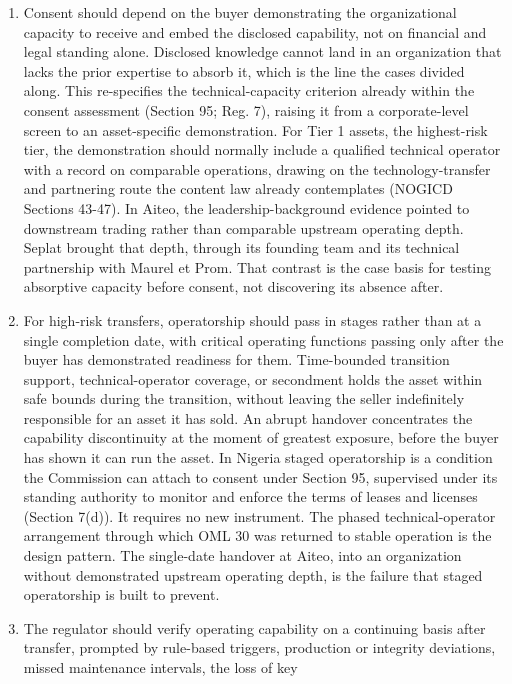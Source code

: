 \begin{enumerate}
  to secure.
\item
  Consent should depend on the buyer demonstrating the organizational
  capacity to receive and embed the disclosed capability, not on
  financial and legal standing alone. Disclosed knowledge cannot land in
  an organization that lacks the prior expertise to absorb it, which is
  the line the cases divided along. This re-specifies the
  technical-capacity criterion already within the consent assessment
  (Section 95; Reg. 7), raising it from a corporate-level screen to an
  asset-specific demonstration. For Tier 1 assets, the highest-risk
  tier, the demonstration should normally include a qualified technical
  operator with a record on comparable operations, drawing on the
  technology-transfer and partnering route the content law already
  contemplates (NOGICD Sections 43-47). In Aiteo, the
  leadership-background evidence pointed to downstream trading rather
  than comparable upstream operating depth. Seplat brought that depth,
  through its founding team and its technical partnership with Maurel et
  Prom. That contrast is the case basis for testing absorptive capacity
  before consent, not discovering its absence after.
\item
  For high-risk transfers, operatorship should pass in stages rather
  than at a single completion date, with critical operating functions
  passing only after the buyer has demonstrated readiness for them.
  Time-bounded transition support, technical-operator coverage, or
  secondment holds the asset within safe bounds during the transition,
  without leaving the seller indefinitely responsible for an asset it
  has sold. An abrupt handover concentrates the capability discontinuity
  at the moment of greatest exposure, before the buyer has shown it can
  run the asset. In Nigeria staged operatorship is a condition the
  Commission can attach to consent under Section 95, supervised under
  its standing authority to monitor and enforce the terms of leases and
  licenses (Section 7(d)). It requires no new instrument. The phased
  technical-operator arrangement through which OML 30 was returned to
  stable operation is the design pattern. The single-date handover at
  Aiteo, into an organization without demonstrated upstream operating
  depth, is the failure that staged operatorship is built to prevent.
\item
  The regulator should verify operating capability on a continuing basis
  after transfer, prompted by rule-based triggers, production or
  integrity deviations, missed maintenance intervals, the loss of key

\end{enumerate}

